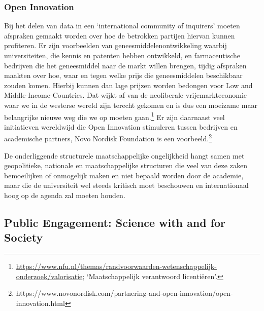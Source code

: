 \documentclass[empirical, authordate, ]{new-jote-article}
\begin{document}
	\subsubsection{Open Innovation}



	Bij het delen van data in een ‘international community of inquirers' moeten afspraken gemaakt worden over hoe de betrokken partijen hiervan kunnen profiteren. Er zijn voorbeelden van geneesmiddelenontwikkeling waarbij universiteiten, die kennis en patenten hebben ontwikkeld, en farmaceutische bedrijven die het geneesmiddel naar de markt willen brengen, tijdig afspraken maakten over hoe, waar en tegen welke prijs die geneesmiddelen beschikbaar zouden komen. Hierbij kunnen dan lage prijzen worden bedongen voor Low and Middle-Income-Countries. Dat wijkt af van de neoliberale vrijemarkteconomie waar we in de westerse wereld zijn terecht gekomen en is dus een moeizame maar belangrijke nieuwe weg die we op moeten gaan.\footnote{\href{https://www.nfu.nl/themas/randvoorwaarden-wetenschappelijk-onderzoek/valorisatie}{https://www.nfu.nl/themas/randvoorwaarden-wetenschappelijk-onderzoek/valorisatie}; ‘Maatschappelijk verantwoord licentiëren'.} Er zijn daarnaast veel initiatieven wereldwijd die Open Innovation stimuleren tussen bedrijven en academische partners, Novo Nordisk Foundation is een voorbeeld.\footnote{https://www.novonordisk.com/partnering-and-open-innovation/open-innovation.html}



	De onderliggende structurele maatschappelijke ongelijkheid hangt samen met geopolitieke, nationale en maatschappelijke structuren die veel van deze zaken bemoeilijken of onmogelijk maken en niet bepaald worden door de academie, maar die de universiteit wel steeds kritisch moet beschouwen en internationaal hoog op de agenda zal moeten houden.



	\subsection{Public Engagement: Science with and for Society }
\end{document}
